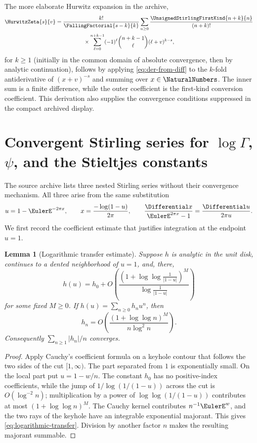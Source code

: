 \documentclass[11pt,a4paper,oneside,openany]{book}
\newtheorem{lemma}[theorem]{Lemma}
\theoremstyle{definition}
\theoremstyle{remark}
\begin{document}
The more elaborate Hurwitz expansion in the archive,
\begin{multline}\label{eq:hurwitz-finite-difference-expansion}
 \HurwitzZeta{s}{v}=\frac{k!}{\FallingFactorial{s-k}{k}}
 \sum_{n\ge0}\frac{\UnsignedStirlingFirstKind{n+k}{n}}{(n+k)!}\\
 {}\times\sum_{\ell=0}^{n+k-1}(-1)^\ell\binom{n+k-1}{\ell}
 (\ell+v)^{k-s},
\end{multline}
for $k\ge1$ (initially in the common domain of absolute convergence, then by
analytic continuation), follows by applying \cref{eq:der-from-diff} to the
$k$-fold antiderivative of $(x+v)^{-s}$ and summing over $x\in\NaturalNumbers$.  The inner sum is
a finite difference, while the outer coefficient is the first-kind conversion
coefficient.  This derivation also supplies the convergence conditions suppressed in
the compact archived display.


\section{Convergent Stirling series for \texorpdfstring{$\log\Gamma$}{log Gamma}, \texorpdfstring{$\psi$}{psi}, and the Stieltjes constants}
The source archive lists three nested Stirling series without their convergence
mechanism.  All three arise from the same substitution
\begin{equation}
\label{eq:logarithmic-binet-substitution}
 u=1-\EulerE^{-2\pi x},
 \qquad
 x=\frac{-\log(1-u)}{2\pi},
 \qquad
 \frac{\Differential x}{\EulerE^{2\pi x}-1}=\frac{\Differential u}{2\pi u}.
\end{equation}
We first record the coefficient estimate that justifies integration at the endpoint
$u=1$.

\begin{lemma}[Logarithmic transfer estimate]
\label{lem:logarithmic-transfer}
Suppose $h$ is analytic in the unit disk, continues to a dented neighborhood of
$u=1$, and, there,
\[
 h(u)=h_0+O\!\left(
 \frac{(1+\log\log\frac1{|1-u|})^M}
      {\log\frac1{|1-u|}}
 \right)
\]
for some fixed $M\ge0$.  If $h(u)=\sum_{n\ge0}h_nu^n$, then
\begin{equation}
\label{eq:logarithmic-transfer}
 h_n=O\!\left(
 \frac{(1+\log\log n)^M}{n\log^2 n}
 \right).
\end{equation}
Consequently $\sum_{n\ge1}|h_n|/n$ converges.
\end{lemma}
\begin{proof}
Apply Cauchy's coefficient formula on a keyhole contour that follows the two sides
of the cut $[1,\infty)$.  The part separated from $1$ is exponentially small.
On the local part put $u=1-w/n$.  The constant $h_0$ has no positive-index
coefficients, while the jump of
$1/\log(1/(1-u))$ across the cut is
$O(\log^{-2}n)$; multiplication by a power of $\log\log(1/(1-u))$ contributes at
most $(1+\log\log n)^M$.  The Cauchy kernel contributes $n^{-1}\EulerE^w$, and the two
rays of the keyhole have an integrable exponential majorant.  This gives
\eqref{eq:logarithmic-transfer}.  Division by another factor $n$ makes the
resulting majorant summable.
\end{proof}
\end{document}
